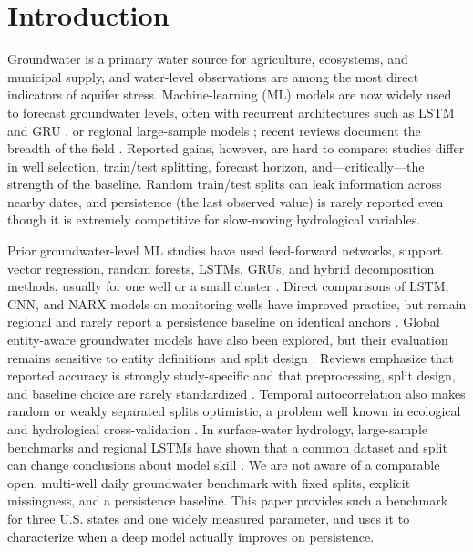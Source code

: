 \documentclass[preprint,12pt]{elsarticle}
\begin{document}
\section{Introduction}

Groundwater is a primary water source for agriculture, ecosystems, and
municipal supply, and water-level observations are among the most direct
indicators of aquifer stress. Machine-learning (ML) models are now widely used
to forecast groundwater levels, often with recurrent architectures such as
LSTM \citep{hochreiter1997} and GRU \citep{cho2014}, or regional large-sample
models \citep{kratzert2019}; recent reviews document the breadth of the field
\citep{shen2018,khan2023,dey2025}. Reported
gains, however, are hard to compare: studies differ in well selection,
train/test splitting, forecast horizon, and---critically---the strength of the
baseline. Random train/test splits can leak information across nearby dates,
and persistence (the last observed value) is rarely reported even though it is
extremely competitive for slow-moving hydrological variables.

Prior groundwater-level ML studies have used feed-forward networks, support
vector regression, random forests, LSTMs, GRUs, and hybrid decomposition
methods, usually for one well or a small cluster
\citep{khan2023,dey2025}. Direct comparisons of LSTM, CNN, and NARX models on
monitoring wells have improved practice, but remain regional and rarely report
a persistence baseline on identical anchors \citep{wunsch2021}. Global
entity-aware groundwater models have also been explored, but their evaluation
remains sensitive to entity definitions and split design \citep{heudorfer2024}.
Reviews emphasize that reported accuracy is strongly study-specific and that
preprocessing, split design, and baseline choice are rarely standardized
\citep{rajaee2019,khan2023,boo2024,shen2018}. Temporal autocorrelation also makes
random or weakly separated splits optimistic, a problem well known in
ecological and hydrological cross-validation
\citep{roberts2017,bergmeir2012}. In surface-water hydrology, large-sample
benchmarks and regional LSTMs have shown that a common dataset and split can
change conclusions about model skill
\citep{addor2017,kratzert2019,reichstein2019,nearing2021}. We are not aware of a comparable
open, multi-well daily groundwater benchmark with fixed splits, explicit
missingness, and a persistence baseline. This paper provides such a benchmark
for three U.S. states and one widely measured parameter, and uses it to
characterize when a deep model actually improves on persistence.
\end{document}

